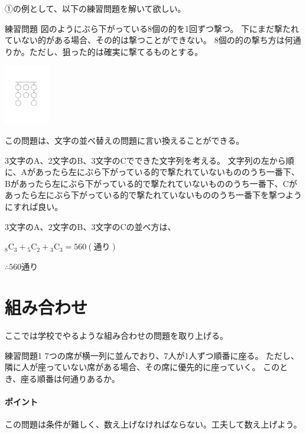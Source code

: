 \documentclass[uplatex,fleqn]{jsbook}
\begin{document}
①の例として、以下の練習問題を解いて欲しい。

\begin{problem}{練習問題}
    図のようにぶら下がっている8個の的を1回ずつ撃つ。
    下にまだ撃たれていない的がある場合、その的は撃つことができない。
    8個の的の撃ち方は何通りか。ただし、狙った的は確実に撃てるものとする。

    \includegraphics[clip,width=2cm]{figures/c_practice1.pdf}
\end{problem}

\begin{answer}
    この問題は、文字の並べ替えの問題に言い換えることができる。

    3文字のA、2文字のB、3文字のCでできた文字列を考える。
    文字列の左から順に、Aがあったら左にぶら下がっている的で撃たれていないもののうち一番下、Bがあったら左にぶら下がっている的で撃たれていないもののうち一番下、Cがあったら左にぶら下がっている的で撃たれていないもののうち一番下を撃つようにすれば良い。

    3文字のA、2文字のB、3文字のCの並べ方は、

    ${}_8\mathrm{C}_3 + {}_5\mathrm{C}_2 + {}_3\mathrm{C}_3
    =560(\text{通り})$

    $\therefore 560$通り
\end{answer}

\section{組み合わせ}
ここでは学校でやるような組み合わせの問題を取り上げる。
\begin{problem}{練習問題1}
    7つの席が横一列に並んでおり、7人が1人ずつ順番に座る。
    ただし、隣に人が座っていない席がある場合、その席に優先的に座っていく。
    このとき、座る順番は何通りあるか。
\end{problem}
\paragraph{ポイント}この問題は条件が難しく、数え上げなければならない。工夫して数え上げよう。
\end{document}

